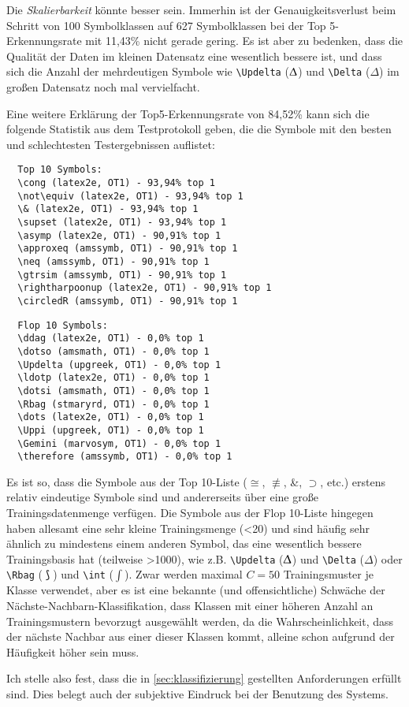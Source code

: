 Die \emph{Skalierbarkeit} könnte besser sein. Immerhin ist der Genauigkeitsverlust beim Schritt von 100 Symbolklassen auf 627 Symbolklassen bei der Top 5-Erkennungsrate mit 11,43\% nicht gerade gering. Es ist aber zu bedenken, dass die Qualität der Daten im kleinen Datensatz eine wesentlich bessere ist, und dass sich die Anzahl der mehrdeutigen Symbole wie \verb!\Updelta! ($\Updelta$) und \verb!\Delta! ($\Delta$) im großen Datensatz noch mal vervielfacht. 

Eine weitere Erklärung der Top5-Erkennungsrate von 84,52\% kann sich die folgende Statistik aus dem Testprotokoll geben, die die Symbole mit den besten und schlechtesten Testergebnissen auflistet:

\begin{verbatim}
  Top 10 Symbols:
  \cong (latex2e, OT1) - 93,94% top 1
  \not\equiv (latex2e, OT1) - 93,94% top 1
  \& (latex2e, OT1) - 93,94% top 1
  \supset (latex2e, OT1) - 93,94% top 1
  \asymp (latex2e, OT1) - 90,91% top 1
  \approxeq (amssymb, OT1) - 90,91% top 1
  \neq (amssymb, OT1) - 90,91% top 1
  \gtrsim (amssymb, OT1) - 90,91% top 1
  \rightharpoonup (latex2e, OT1) - 90,91% top 1
  \circledR (amssymb, OT1) - 90,91% top 1
\end{verbatim}
  
\begin{verbatim}
  Flop 10 Symbols:
  \ddag (latex2e, OT1) - 0,0% top 1
  \dotso (amsmath, OT1) - 0,0% top 1
  \Updelta (upgreek, OT1) - 0,0% top 1
  \ldotp (latex2e, OT1) - 0,0% top 1
  \dotsi (amsmath, OT1) - 0,0% top 1
  \Rbag (stmaryrd, OT1) - 0,0% top 1
  \dots (latex2e, OT1) - 0,0% top 1
  \Uppi (upgreek, OT1) - 0,0% top 1
  \Gemini (marvosym, OT1) - 0,0% top 1
  \therefore (amssymb, OT1) - 0,0% top 1
\end{verbatim}

Es ist so, dass die Symbole aus der Top 10-Liste ($\cong$, $\not\equiv$, \&, $\supset$, etc.) erstens relativ eindeutige Symbole sind und andererseits über eine große Trainingsdatenmenge verfügen. Die Symbole aus der Flop 10-Liste hingegen haben allesamt eine sehr kleine Trainingsmenge (<20) und sind häufig sehr ähnlich zu mindestens einem anderen Symbol, das eine wesentlich bessere Trainingsbasis hat (teilweise >1000), wie z.B. \verb!\Updelta! ($\Updelta$) und \verb!\Delta! ($\Delta$) oder \verb!\Rbag! ($\Rbag$) und \verb!\int! ($\int$). Zwar werden maximal $C=50$ Trainingsmuster je Klasse verwendet, aber es ist eine bekannte (und offensichtliche) Schwäche der Nächste-Nachbarn-Klassifikation, dass Klassen mit einer höheren Anzahl an Trainingsmustern bevorzugt ausgewählt werden, da die Wahrscheinlichkeit, dass der nächste Nachbar aus einer dieser Klassen kommt, alleine schon aufgrund der Häufigkeit höher sein muss.

Ich stelle also fest, dass die in \ref{sec:klassifizierung} gestellten Anforderungen erfüllt sind. Dies belegt auch der subjektive Eindruck bei der Benutzung des Systems.